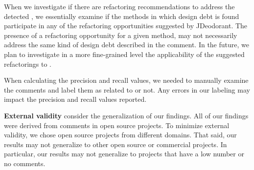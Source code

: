 When we investigate if there are refactoring recommendations to address the detected \SATD, we essentially examine if the methods in which design debt is found participate in any of the refactoring opportunities suggested by JDeodorant.
The presence of a refactoring opportunity for a given method, may not necessarily address the same kind of design debt described in the comment. In the future, we plan to investigate in a more fine-grained level the applicability of the suggested refactorings to \SATD.

When calculating the precision and recall values, we needed to manually examine the comments and label them as related to \SATD or not. Any errors in our labeling may impact the precision and recall values reported.


\noindent \textbf{External validity} consider the generalization of our findings. All of our findings were derived from comments in open source projects. To minimize external validity, we chose open source projects from different domains. That said, our results may not generalize to other open source or commercial projects. In particular, our results may not generalize to projects that have a low number or no comments.
